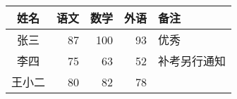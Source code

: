 \documentclass[nofonts]{ctexart}
\begin{document}
\begin{tabular}{|c|rrr|p{4em}|}
	\hline
	姓名	& 语文	& 数学	& 外语	& 备注			\\
	\hline
	张三	& 87	& 100	& 93	& 优秀			\\
	李四	& 75	& 63	& 52	& 补考另行通知	\\
	王小二	& 80	& 82	& 78	&				\\
	\hline
\end{tabular}
\end{document}

